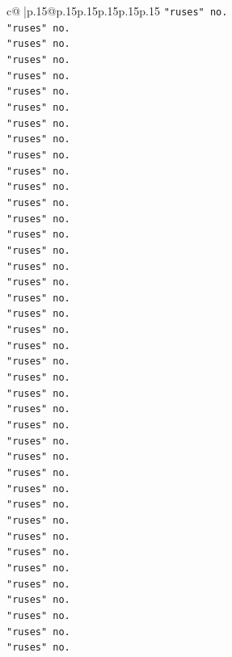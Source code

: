 \documentclass{article}
\begin{document}
{\begin{supertabular}{c@{$\;$}|p{.15\linewidth}@{}p{.15\linewidth}p{.15\linewidth}p{.15\linewidth}p{.15\linewidth}p{.15\linewidth}}
{{{\texttt{"ruses" no.} \\
\texttt{"ruses" no.} \\
\texttt{"ruses" no.} \\
\texttt{"ruses" no.} \\
\texttt{"ruses" no.} \\
\texttt{"ruses" no.} \\
\texttt{"ruses" no.} \\
\texttt{"ruses" no.} \\
\texttt{"ruses" no.} \\
\texttt{"ruses" no.} \\
\texttt{"ruses" no.} \\
\texttt{"ruses" no.} \\
\texttt{"ruses" no.} \\
\texttt{"ruses" no.} \\
\texttt{"ruses" no.} \\
\texttt{"ruses" no.} \\
\texttt{"ruses" no.} \\
\texttt{"ruses" no.} \\
\texttt{"ruses" no.} \\
\texttt{"ruses" no.} \\
\texttt{"ruses" no.} \\
\texttt{"ruses" no.} \\
\texttt{"ruses" no.} \\
\texttt{"ruses" no.} \\
\texttt{"ruses" no.} \\
\texttt{"ruses" no.} \\
\texttt{"ruses" no.} \\
\texttt{"ruses" no.} \\
\texttt{"ruses" no.} \\
\texttt{"ruses" no.} \\
\texttt{"ruses" no.} \\
\texttt{"ruses" no.} \\
\texttt{"ruses" no.} \\
\texttt{"ruses" no.} \\
\texttt{"ruses" no.} \\
\texttt{"ruses" no.} \\
\texttt{"ruses" no.} \\
\texttt{"ruses" no.} \\
\texttt{"ruses" no.} \\
\texttt{"ruses" no.} \\
\texttt{"ruses" no.} \\
}}}
\end{supertabular}}
\end{document}
